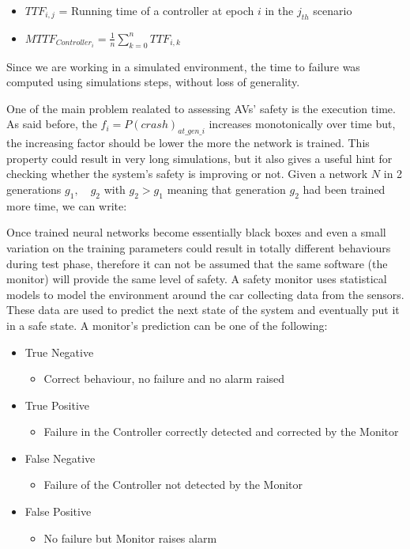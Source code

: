\begin{itemize}
	\item $TTF_{i,j}$ = Running time of a controller at epoch $i$ in the $j_{th}$ scenario 
	\item $MTTF_{Controller_{i}} = \frac{1}{n} \sum_{k = 0}^{n} TTF_{i,k}$
\end{itemize}

Since we are working in a simulated environment, the time to failure was computed using simulations steps, without loss of generality.\newline 

One of the main problem realated to assessing AVs' safety is the execution time. As said before, the $f_{i} = P(crash)_{at\_gen\_i}$ increases monotonically over time but, the increasing factor should be lower the more the network is trained. This property could result in very long simulations, but it also gives a useful hint for checking whether the system's safety is improving or not.\newline
Given a network $N$ in 2 generations $g_{1}, \quad g_{2}$ with $g_{2} > g_{1}$ meaning that generation $g_2$ had been trained more time, we can write:\newline\newline


Once trained neural networks become essentially black boxes and even a small variation on the training parameters could result in totally different behaviours during test phase, therefore it can not be assumed that the same software (the monitor) will provide the same level of safety.\newline
A safety monitor uses statistical models to model the environment around the car collecting data from the sensors. These data are used to predict the next state of the system and eventually put it in a safe state.\newline
A monitor's prediction can be one of the following:

\begin{itemize}
	\item True Negative
	\begin{itemize}
		\item Correct behaviour, no failure and no alarm raised
	\end{itemize}
	\item True Positive
	\begin{itemize}
		\item Failure in the Controller correctly detected and corrected by the Monitor
	\end{itemize}
	\item False Negative
	\begin{itemize}
		\item Failure of the Controller not detected by the Monitor
	\end{itemize}
	\item False Positive
	\begin{itemize}
		\item No failure but Monitor raises alarm
	\end{itemize}
\end{itemize}

